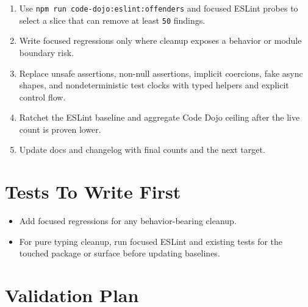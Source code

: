\begin{enumerate}
\def\labelenumi{\arabic{enumi}.}
\tightlist
\item
  Use \texttt{n\allowbreak{}p\allowbreak{}m\allowbreak{} \allowbreak{}r\allowbreak{}u\allowbreak{}n\allowbreak{} \allowbreak{}c\allowbreak{}o\allowbreak{}d\allowbreak{}e\allowbreak{}-\allowbreak{}d\allowbreak{}o\allowbreak{}j\allowbreak{}o\allowbreak{}:\allowbreak{}e\allowbreak{}s\allowbreak{}l\allowbreak{}i\allowbreak{}n\allowbreak{}t\allowbreak{}:\allowbreak{}o\allowbreak{}f\allowbreak{}f\allowbreak{}e\allowbreak{}n\allowbreak{}d\allowbreak{}e\allowbreak{}r\allowbreak{}s} and focused ESLint probes to select a slice that can remove at least \texttt{5\allowbreak{}0} findings.
\item
  Write focused regressions only where cleanup exposes a behavior or module boundary risk.
\item
  Replace unsafe assertions, non-null assertions, implicit coercions, fake async shapes, and nondeterministic test clocks with typed helpers and explicit control flow.
\item
  Ratchet the ESLint baseline and aggregate Code Dojo ceiling after the live count is proven lower.
\item
  Update docs and changelog with final counts and the next target.
\end{enumerate}

\section{Tests To Write First}\label{record-235-tests-to-write-first}

\begin{itemize}
\tightlist
\item
  Add focused regressions for any behavior-bearing cleanup.
\item
  For pure typing cleanup, run focused ESLint and existing tests for the touched package or surface before updating baselines.
\end{itemize}

\section{Validation Plan}\label{record-235-validation-plan}

